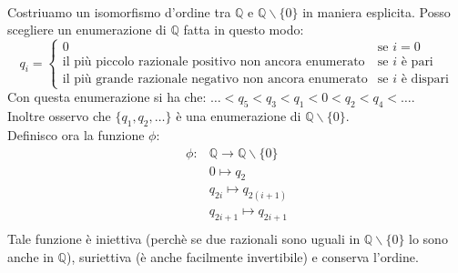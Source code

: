 \documentclass[12pt,a4paper,draft]{article}
\begin{document}
\paragraph{} Costriuamo un isomorfismo d'ordine tra $\mathbb{Q}$ e $\mathbb{Q}\backslash\{0\}$ in maniera esplicita. Posso scegliere un enumerazione di $\mathbb{Q}$ fatta in questo modo:
\[q_i=
\begin{cases} 
0 & \mbox{se } i= 0 \\ 
\mbox{il più piccolo razionale positivo non ancora enumerato} & \mbox{se } i \mbox{ è pari} \\
\mbox{il più grande razionale negativo non ancora enumerato} & \mbox{se } i \mbox{ è dispari}
\end{cases}\]
Con questa enumerazione si ha che: $ \ldots < q_5 < q_3 < q_1 < 0 < q_2 < q_4 < \ldots $.\\
Inoltre osservo che $\{q_1,q_2,\ldots\}$ è una enumerazione di $\mathbb{Q}\backslash\{0\}$. \\
Definisco ora la funzione $\phi$: 
\[
\begin{array}{cc}
\phi: & \mathbb{Q} \rightarrow \mathbb{Q}\backslash\{0\} \\
& 0 \mapsto q_2 \\
& q_{2i} \mapsto q_{2(i+1)} \\
& q_{2i+1} \mapsto q_{2i+1} \\
\end{array} \]
Tale funzione è iniettiva (perchè se due razionali sono uguali in $\mathbb{Q}\backslash\{0\}$ lo sono anche in $\mathbb{Q}$), suriettiva (è anche facilmente invertibile) e conserva l'ordine.
\end{document}
